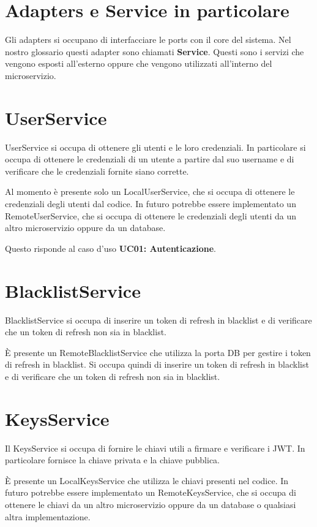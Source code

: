 


\section{Adapters e Service in particolare}

Gli adapters si occupano di interfacciare le ports con il core del sistema. Nel nostro glossario questi adapter sono chiamati \textbf{Service}. Questi sono i servizi che vengono esposti all'esterno oppure che vengono utilizzati all'interno del microservizio.

\section{UserService}

UserService si occupa di ottenere gli utenti e le loro credenziali. In particolare si occupa di ottenere le credenziali di un utente a partire dal suo username e di verificare che le credenziali fornite siano corrette.

Al momento è presente solo un LocalUserService, che si occupa di ottenere le credenziali degli utenti dal codice. In futuro potrebbe essere implementato un RemoteUserService, che si occupa di ottenere le credenziali degli utenti da un altro microservizio oppure da un database.

Questo risponde al caso d'uso \textbf{UC01: Autenticazione}.

\section{BlacklistService}

BlacklistService si occupa di inserire un token di refresh in blacklist e di verificare che un token di refresh non sia in blacklist.

È presente un RemoteBlacklistService che utilizza la porta DB per gestire i token di refresh in blacklist. Si occupa quindi di inserire un token di refresh in blacklist e di verificare che un token di refresh non sia in blacklist.

\section{KeysService}

Il KeysService si occupa di fornire le chiavi utili a firmare e verificare i JWT. In particolare fornisce la chiave privata e la chiave pubblica.

È presente un LocalKeysService che utilizza le chiavi presenti nel codice. In futuro potrebbe essere implementato un RemoteKeysService, che si occupa di ottenere le chiavi da un altro microservizio oppure da un database o qualsiasi altra implementazione.
